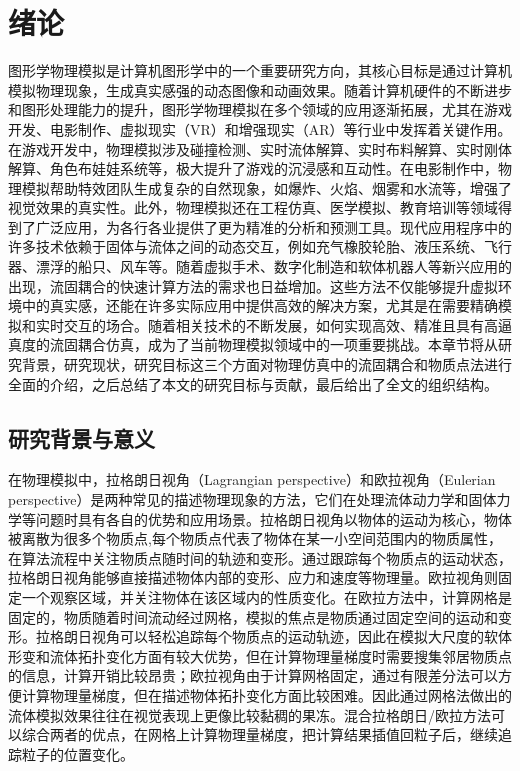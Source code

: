 \chapter{绪论} \label{chap:introduction}
图形学物理模拟是计算机图形学中的一个重要研究方向，其核心目标是通过计算机模拟物理现象，生成真实感强的动态图像和动画效果。随着计算机硬件的不断进步和图形处理能力的提升，图形学物理模拟在多个领域的应用逐渐拓展，尤其在游戏开发、电影制作、虚拟现实（VR）和增强现实（AR）等行业中发挥着关键作用。在游戏开发中，物理模拟涉及碰撞检测、实时流体解算、实时布料解算、实时刚体解算、角色布娃娃系统等，极大提升了游戏的沉浸感和互动性。在电影制作中，物理模拟帮助特效团队生成复杂的自然现象，如爆炸、火焰、烟雾和水流等，增强了视觉效果的真实性。此外，物理模拟还在工程仿真、医学模拟、教育培训等领域得到了广泛应用，为各行各业提供了更为精准的分析和预测工具。现代应用程序中的许多技术依赖于固体与流体之间的动态交互，例如充气橡胶轮胎、液压系统、飞行器、漂浮的船只、风车等。随着虚拟手术、数字化制造和软体机器人等新兴应用的出现，流固耦合的快速计算方法的需求也日益增加。这些方法不仅能够提升虚拟环境中的真实感，还能在许多实际应用中提供高效的解决方案，尤其是在需要精确模拟和实时交互的场合。随着相关技术的不断发展，如何实现高效、精准且具有高逼真度的流固耦合仿真，成为了当前物理模拟领域中的一项重要挑战。本章节将从研究背景，研究现状，研究目标这三个方面对物理仿真中的流固耦合和物质点法进行全面的介绍，之后总结了本文的研究目标与贡献，最后给出了全文的组织结构。

\section{研究背景与意义}\label{sect:intro:bg}
在物理模拟中，拉格朗日视角（Lagrangian perspective）和欧拉视角（Eulerian perspective）是两种常见的描述物理现象的方法，它们在处理流体动力学和固体力学等问题时具有各自的优势和应用场景。拉格朗日视角以物体的运动为核心，物体被离散为很多个物质点,每个物质点代表了物体在某一小空间范围内的物质属性，在算法流程中关注物质点随时间的轨迹和变形。通过跟踪每个物质点的运动状态，拉格朗日视角能够直接描述物体内部的变形、应力和速度等物理量。欧拉视角则固定一个观察区域，并关注物体在该区域内的性质变化。在欧拉方法中，计算网格是固定的，物质随着时间流动经过网格，模拟的焦点是物质通过固定空间的运动和变形。拉格朗日视角可以轻松追踪每个物质点的运动轨迹，因此在模拟大尺度的软体形变和流体拓扑变化方面有较大优势，但在计算物理量梯度时需要搜集邻居物质点的信息，计算开销比较昂贵；欧拉视角由于计算网格固定，通过有限差分法可以方便计算物理量梯度，但在描述物体拓扑变化方面比较困难。因此通过网格法做出的流体模拟效果往往在视觉表现上更像比较黏稠的果冻。混合拉格朗日/欧拉方法可以综合两者的优点，在网格上计算物理量梯度，把计算结果插值回粒子后，继续追踪粒子的位置变化。

